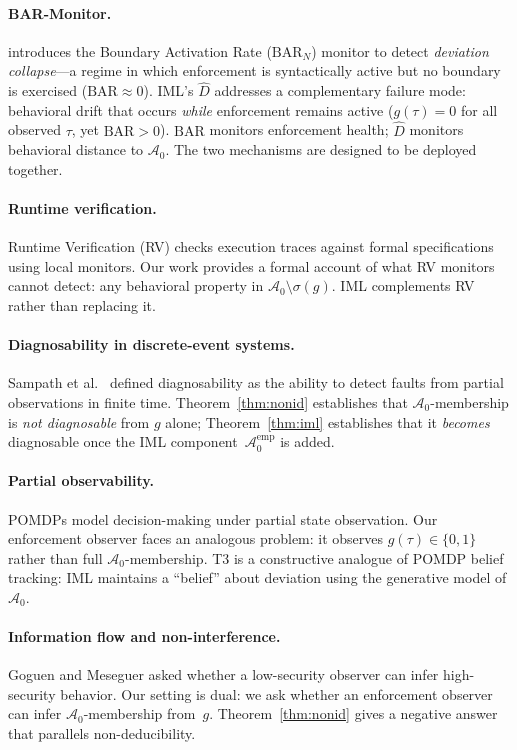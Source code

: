 \documentclass[11pt]{article}
\newcommand{\Azero}{\mathcal{A}_0}
\newcommand{\Dhat}{\widehat{D}}
\newcommand{\sigg}{\sigma(g)}
\begin{document}
\paragraph{BAR-Monitor.}
\citet{fernandez2026acp} introduces the Boundary Activation Rate
($\mathrm{BAR}_N$) monitor to detect \emph{deviation collapse}---a regime
in which enforcement is syntactically active but no boundary is exercised
($\mathrm{BAR} \approx 0$).  IML's $\Dhat$ addresses a complementary failure
mode: behavioral drift that occurs \emph{while} enforcement remains active
($g(\tau) = 0$ for all observed $\tau$, yet $\mathrm{BAR} > 0$).
$\mathrm{BAR}$ monitors enforcement health; $\Dhat$ monitors behavioral
distance to $\Azero$.  The two mechanisms are designed to be deployed
together.

\paragraph{Runtime verification.}
Runtime Verification (RV) \cite{leucker2009brief,falcone2012runtime} checks
execution traces against formal specifications using local monitors.
Our work provides a formal account of what RV monitors cannot detect: any
behavioral property in $\Azero \setminus \sigg$.  IML complements RV rather
than replacing it.

\paragraph{Diagnosability in discrete-event systems.}
Sampath et al.\ \cite{sampath1995diagnosability} defined diagnosability as the
ability to detect faults from partial observations in finite time.
Theorem~\ref{thm:nonid} establishes that $\Azero$-membership is
\emph{not diagnosable} from $g$ alone; Theorem~\ref{thm:iml} establishes
that it \emph{becomes} diagnosable once the IML component~$\Azero^{\mathrm{emp}}$
is added.

\paragraph{Partial observability.}
POMDPs \cite{kaelbling1998planning} model decision-making under partial
state observation.  Our enforcement observer faces an analogous problem:
it observes $g(\tau) \in \{0,1\}$ rather than full $\Azero$-membership.
T3 is a constructive analogue of POMDP belief tracking: IML maintains a
``belief'' about deviation using the generative model of $\Azero$.

\paragraph{Information flow and non-interference.}
Goguen and Meseguer \cite{goguen1982security} asked whether a low-security
observer can infer high-security behavior.  Our setting is dual: we ask
whether an enforcement observer can infer $\Azero$-membership from~$g$.
Theorem~\ref{thm:nonid} gives a negative answer that parallels non-deducibility.
\end{document}
